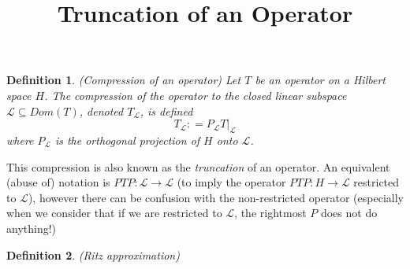\documentclass{article}
\title{Truncation of an Operator}
\newtheorem*{definition}{Definition}
\newcommand{\eqdef}{\mathrel{\mathop:}=}
\begin{document}
\maketitle

\begin{definition}{(Compression of an operator)}
Let $T$ be an operator on a Hilbert space $H$. The compression of
the operator to the closed linear subspace $\mathcal{L} \subseteq Dom(T)$,
denoted $T_\mathcal{L}$, is defined
$$T_\mathcal{L} \eqdef P_\mathcal{L} T\big|_{\mathcal{L}}$$
where $P_\mathcal{L}$ is the orthogonal projection of $H$ onto $\mathcal{L}$.
\end{definition}

This compression is also known as the \emph{truncation} of an operator. An equivalent (abuse of) notation 
is $PTP: \mathcal{L} \rightarrow \mathcal{L}$ (to imply the operator $PTP: H \rightarrow \mathcal{L}$ 
restricted to $\mathcal{L}$), however there can be confusion with the non-restricted operator 
(especially when we consider that if we are restricted to $\mathcal{L}$, the rightmost $P$ does not do anything!)



\begin{definition}{(Ritz approximation)}

\end{definition}

\printbibliography
\end{document}
